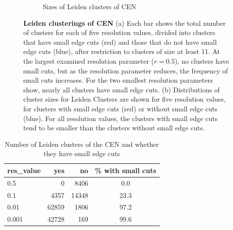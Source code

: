 \documentclass[11pt]{article}   	%
\begin{document}
\begin{figure}[H]
\begin{subfigure}[t]{0.45\textwidth}
\begin{center}
\caption{Sizes of Leiden clusters of CEN}
\end{center}
\label{fig:cenistouched-part2}
\end{subfigure}
\caption{\textbf {Leiden clusterings of CEN} (a)
Each bar shows the total number of clusters for each of five resolution values, divided into clusters that have small edge cuts (red)  and those that do not have small edge cuts (blue), after restriction  to clusters of size at least 11. At the largest examined resolution parameter ($r=0.5$), no clusters have small cuts, but  as the resolution parameter reduces, the frequency of  small cuts increases.
For the two smallest resolution parameters show, nearly all clusters have small edge cuts.
(b)  Distributions of cluster sizes  for Leiden Clusters are shown for five resolution values, for clusters with small edge cuts (red) or without small edge cuts (blue). For all resolution values, the clusters with small edge cuts tend to be smaller than the clusters without small edge cuts.}
\label{fig:cenistouched-leiden}
\end{figure}

\begin{table}[ht]
\centering
\begin{tabular}{lrrc}
  \hline
res\_value  & yes & no & \% with small cuts\\
  \hline
  0.5 & 0  & 8406  & 0.0\\
  0.1 & 4357 & 14348 & 23.3\\
    0.01 & 62859 & 1806 & 97.2\\
  0.001 & 42728 & 169 & 99.6 \\
   \hline
\end{tabular}
\caption{Number of Leiden clusters of the CEN and whether they have small edge cuts}
\label{tab:Leiden-CEN-num-smallcut}
\end{table}
\end{document}

